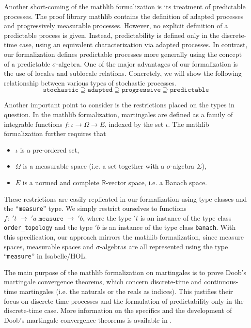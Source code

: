 Another short-coming of the \textsf{mathlib} formalization is its treatment of predictable processes. The proof library \textsf{mathlib} contains the definition of adapted processes and progressively measurable processes. However, no explicit definition of a predictable process is given. Instead, predictability is defined only in the discrete-time case, using an equivalent characterization via adapted processes. In contrast, our formalization defines predictable processes more generally using the concept of a predictable $\sigma$-algebra. One of the major advantages of our formalization is the use of locales and sublocale relations. Concretely, we will show the following relationship between various types of stochastic processes.
\[
	\texttt{stochastic} \supseteq \texttt{adapted} \supseteq \texttt{progressive} \supseteq \texttt{predictable}
\]

Another important point to consider is the restrictions placed on the types in question. In the \textsf{mathlib} formalization, martingales are defined as a family of integrable functions $f : \iota \rightarrow \Omega \rightarrow E$, indexed by the set $\iota$. The \textsf{mathlib} formalization further requires that
\begin{itemize}
\item $\iota$ is a pre-ordered set,
\item $\Omega$ is a measurable space (i.e. a set together with a $\sigma$-algebra $\Sigma$),
\item $E$ is a normed and complete $\mathbb{R}$-vector space, i.e. a Banach space.
\end{itemize}

These restrictions are easily replicated in our formalization using type classes and the ``\texttt{measure}'' type. We simply restrict ourselves to functions $f : \; 't \;\rightarrow \; 'a \;\texttt{measure} \;\rightarrow\; 'b$, where the type $'t$ is an instance of the type class \texttt{order\_topology} and the type $'b$ is an instance of the type class \texttt{banach}. With this specification, our approach mirrors the \textsf{mathlib} formalization, since measure spaces, measurable spaces and $\sigma$-algebras are all represented using the type ``\texttt{measure}'' in Isabelle/HOL.

The main purpose of the \textsf{mathlib} formalization on martingales is to prove Doob's martingale convergence theorems, which concern discrete-time and continuous-time martingales (i.e. the naturals or the reals as indices). This justifies their focus on discrete-time processes and the formulation of predictability only in the discrete-time case. More information on the specifics and the development of Doob's martingale convergence theorems is available in \cite{ying2022formalization}.

